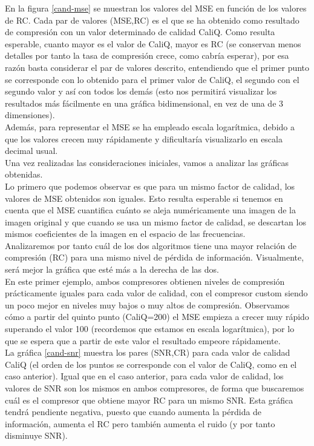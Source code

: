 \documentclass[12pt,a4paper]{article}
\begin{document}
\vspace{2em}
En la figura \ref{cand-mse} se muestran los valores del MSE en función de los valores de RC. Cada par de valores (MSE,RC) es el que se ha obtenido como resultado de compresión con un valor determinado de calidad CaliQ. Como resulta esperable, cuanto mayor es el valor de CaliQ, mayor es RC (se conservan menos detalles por tanto la tasa de compresión crece, como cabría esperar), por esa razón basta considerar el par de valores descrito, entendiendo que el primer punto se corresponde con lo obtenido para el primer valor de CaliQ, el segundo con el segundo valor y así con todos los demás (esto nos permitirá visualizar los resultados más fácilmente en una gráfica bidimensional, en vez de una de 3 dimensiones).\\ 

Además, para representar el MSE se ha empleado escala logarítmica, debido a que los valores crecen muy rápidamente y dificultaría visualizarlo en escala decimal usual.\\

Una vez realizadas las consideraciones iniciales, vamos a analizar las gráficas obtenidas.\\

Lo primero que podemos observar es que para un mismo factor de calidad, los valores de MSE obtenidos son iguales. Esto resulta esperable si tenemos en cuenta que el MSE cuantifica cuánto se aleja numéricamente una imagen de la imagen original y que cuando se usa un mismo factor de calidad, se descartan los mismos coeficientes de la imagen en el espacio de las frecuencias.\\

Analizaremos por tanto cuál de los dos algoritmos tiene una mayor relación de compresión (RC) para una mismo nivel de pérdida de información. Visualmente, será mejor la gráfica que esté más a la derecha de las dos.\\

En este primer ejemplo, ambos compresores obtienen niveles de compresión prácticamente iguales para cada valor de calidad, con el compresor custom siendo un poco mejor en niveles muy bajos o muy altos de compresión. Observamos cómo a partir del quinto punto (CaliQ=200) el MSE empieza a crecer muy rápido superando el valor 100 (recordemos que estamos en escala logarítmica), por lo que se espera que a partir de este valor el resultado empeore rápidamente.\\

La gráfica \ref{cand-snr} muestra los pares (SNR,CR) para cada valor de calidad CaliQ (el orden de los puntos se corresponde con el valor de CaliQ, como en el caso anterior). Igual que en el caso anterior, para cada valor de calidad, los valores de SNR son los mismos en ambos compresores, de forma que buscaremos cuál es el compresor que obtiene mayor RC para un mismo SNR. Esta gráfica tendrá pendiente negativa, puesto que cuando aumenta la pérdida de información, aumenta el RC pero también aumenta el ruido (y por tanto disminuye SNR).\\
\end{document}
